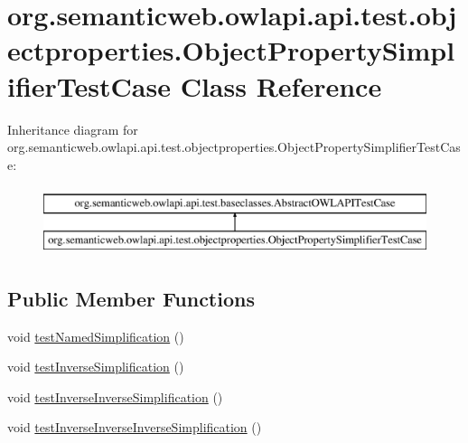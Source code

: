 \hypertarget{classorg_1_1semanticweb_1_1owlapi_1_1api_1_1test_1_1objectproperties_1_1_object_property_simplifier_test_case}{\section{org.\-semanticweb.\-owlapi.\-api.\-test.\-objectproperties.\-Object\-Property\-Simplifier\-Test\-Case Class Reference}
\label{classorg_1_1semanticweb_1_1owlapi_1_1api_1_1test_1_1objectproperties_1_1_object_property_simplifier_test_case}
}
Inheritance diagram for org.\-semanticweb.\-owlapi.\-api.\-test.\-objectproperties.\-Object\-Property\-Simplifier\-Test\-Case\-:\begin{figure}[H]
\begin{center}
\leavevmode
\includegraphics[height=2.000000cm]{classorg_1_1semanticweb_1_1owlapi_1_1api_1_1test_1_1objectproperties_1_1_object_property_simplifier_test_case}
\end{center}
\end{figure}
\subsection*{Public Member Functions}
\begin{DoxyCompactItemize}
\item 
void \hyperlink{classorg_1_1semanticweb_1_1owlapi_1_1api_1_1test_1_1objectproperties_1_1_object_property_simplifier_test_case_ad934e2a90fb0c41428c6d02cf664c784}{test\-Named\-Simplification} ()
\item 
void \hyperlink{classorg_1_1semanticweb_1_1owlapi_1_1api_1_1test_1_1objectproperties_1_1_object_property_simplifier_test_case_a3d2fb9a1f42729146dca76adb7d47262}{test\-Inverse\-Simplification} ()
\item 
void \hyperlink{classorg_1_1semanticweb_1_1owlapi_1_1api_1_1test_1_1objectproperties_1_1_object_property_simplifier_test_case_a83818be8927dba1f04353311f6b3397c}{test\-Inverse\-Inverse\-Simplification} ()
\item 
void \hyperlink{classorg_1_1semanticweb_1_1owlapi_1_1api_1_1test_1_1objectproperties_1_1_object_property_simplifier_test_case_a91c6dd3342fa597fd5b5a7337130cb83}{test\-Inverse\-Inverse\-Inverse\-Simplification} ()
\end{DoxyCompactItemize}
